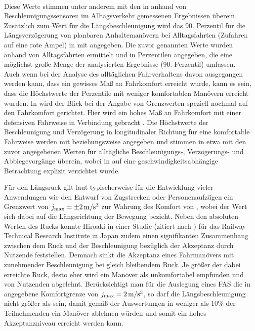 \\
Diese Werte stimmen unter anderem mit den in \cite{Hugemann.2003} anhand von Beschleunigungssensoren im Alltagsverkehr gemessenen Ergebnissen überein. Zusätzlich zum Wert für die Längsbeschleunigung wird das 90. Perzentil für die Längsverzögerung von planbaren Anhaltemanövern bei Alltagsfahrten (Zufahren auf eine rote Ampel) in \cite{Hugemann.2003} mit  angegeben. 
Die zuvor genannten Werte wurden anhand von Alltagsfahrten ermittelt und in Perzentilen angegeben, die eine möglichst große Menge der analysierten Ergebnisse (90. Perzentil) umfassen. Auch wenn bei der Analyse des alltäglichen Fahrverhaltens davon ausgegangen werden kann, dass ein gewisses Maß an Fahrkomfort erreicht wurde, kann es sein, dass die Höchstwerte der Perzentile mit weniger komfortablen Manövern erreicht wurden. In \cite{Schwab.2019} wird der Blick bei der Angabe von Grenzwerten speziell nochmal auf den Fahrkomfort gerichtet. Hier wird ein hohes Maß an Fahrkomfort mit einer defensiven Fahrweise in Verbindung gebracht \cite{Schwab.2019}. Die Höchstwerte der Beschleunigung und Verzögerung in longitudinaler Richtung für eine komfortable Fahrweise werden mit  beziehungsweise  angegeben \cite{Schwab.2019} und stimmen in etwa mit den zuvor angegebenen Werten für alltägliche Beschleunigungs-, Verzögerungs- und Abbiegevorgänge überein, wobei in \cite{Schwab.2019} auf eine geschwindigkeitsabhängige Betrachtung explizit verzichtet wurde.

Für den Längsruck gilt laut \cite{CanudasdeWit.2005} typischerweise für die Entwicklung vieler Anwendungen wie den Entwurf von Zugstrecken oder Personenaufzügen ein Grenzwert von $j_{\textrm{max}} = \pm2\,\mathrm{m/s^3}$ zur Wahrung des Komfort von , wobei der Wert sich dabei auf die Längsrichtung der Bewegung bezieht. Neben den absoluten Werten des Rucks konnte Hiroaki in einer Studie \cite{Hiroaki.1995} (zitiert nach \cite{Powell.2015}) für das Railway Technical Research Institute in Japan zudem einen signifikanten Zusammenhang zwischen dem Ruck und der Beschleunigung bezüglich der Akzeptanz durch Nutzende feststellen. Demnach sinkt die Akzeptanz eines Fahrmanövers mit zunehmender Beschleunigung bei gleich bleibendem Ruck. Je größer der dabei erreichte Ruck, desto eher wird ein Manöver als unkomfortabel empfunden und von Nutzenden abgelehnt. Berücksichtigt man für die Auslegung eines \gls{FAS} die in \cite{CanudasdeWit.2005} angegebene Komfortgrenze von $j_{\textrm{max}} = 2\,\mathrm{m/s^3}$, so darf die Längsbeschleunigung nicht größer als  sein, damit gemäß der Auswertungen in \cite{Hiroaki.1995} weniger als 10\% der Teilnehmenden ein Manöver ablehnen würden und somit ein hohes Akzeptanzniveau erreicht werden kann.

